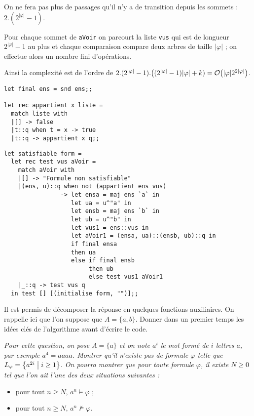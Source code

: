 \begin{Answer}
On ne fera pas plus de passages qu'il n'y a de transition depuis les sommets :  $2.(2^{|\varphi|}-1)$.

Pour chaque sommet de {\tt aVoir} on parcourt la liste {\tt vus} qui est de longueur $2^{|\varphi|}-1$ au plus et chaque comparaison compare deux arbres de taille $|\varphi|$ ; on effectue alors un nombre fini d'opérations.

Ainsi la complexité est de l'ordre de $2.(2^{|\varphi|}-1).\bigl((2^{|\varphi|}-1)|\varphi|+k)={\cal O}\bigl( |\varphi|2^{2|\varphi|}\bigr)$.

\begin{lstlisting}
let final ens = snd ens;;

let rec appartient x liste =
  match liste with
  |[] -> false
  |t::q when t = x -> true
  |t::q -> appartient x q;;
\end{lstlisting}
\newpage

\begin{lstlisting}
let satisfiable form =
  let rec test vus aVoir =
    match aVoir with
    |[] -> "Formule non satisfiable"
    |(ens, u)::q when not (appartient ens vus)
                -> let ensa = maj ens `a` in
                   let ua = u^"a" in
                   let ensb = maj ens `b` in
                   let ub = u^"b" in
                   let vus1 = ens::vus in
                   let aVoir1 = (ensa, ua)::(ensb, ub)::q in
                   if final ensa
                   then ua
                   else if final ensb
                        then ub
                        else test vus1 aVoir1
    |_::q -> test vus q
  in test [] [(initialise form, "")];;
\end{lstlisting}
\end{Answer}
Il est permis de décomposer la réponse en quelques fonctions auxiliaires. On rappelle ici que l'on suppose que $A=\{a, b\}$. Donner dans un premier temps les idées clés de l'algorithme avant d'écrire le code.
\begin{Exercise}\it
Pour cette question, on pose $A=\{a\}$ et on note $a^i$ le mot formé de $i$ lettres $a$, par exemple $a^4=aaaa$. Montrer qu'il n'existe pas de formule $\varphi$ telle que $L_\varphi=\bigl\{a^{2i}\bigm|i\ge  1\bigr\}$. On pourra montrer que pour toute formule $\varphi$, il existe $N\ge  0$ tel que l'on ait l'une des deux situations suivantes :
\begin{itemize}
  \item pour tout $n\ge  N$, $a^n\vDash\varphi$ ;
  \item pour tout $n\ge  N$, $a^n\nvDash\varphi$.
\end{itemize}
\end{Exercise}
